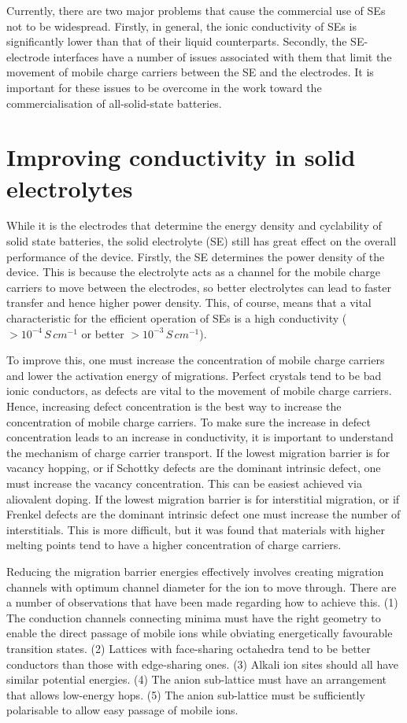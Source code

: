 \documentclass[10pt,a4paper, titlepage]{article}
\begin{document}
Currently, there are two major problems that cause the commercial use of SEs not to be widespread. Firstly, in general, the ionic conductivity of SEs is significantly lower than that of their liquid counterparts. Secondly, the SE-electrode interfaces have a number of issues associated with them that limit the movement of mobile charge carriers between the SE and the electrodes. It is important for these issues to be overcome in the work toward the commercialisation of all-solid-state batteries.

\section{Improving conductivity in solid electrolytes}

While it is the electrodes that determine the energy density and cyclability of solid state batteries, the solid electrolyte (SE) still has great effect on the overall performance of the device. 
Firstly, the SE determines the power density of the device. \cite{RN9}
This is because the electrolyte acts as a channel for the mobile charge carriers to move between the electrodes, so better electrolytes can lead to faster transfer and hence higher power density.
This, of course, means that a vital characteristic for the efficient operation of SEs is a high conductivity ($ > 10^{-4} \, S \, cm^{-1} $ or better $ > 10^{-3} \, S \, cm^{-1} $). \cite{RN3}

To improve this, one must increase the concentration of mobile charge carriers and lower the activation energy of migrations.
Perfect crystals tend to be bad ionic conductors, as defects are vital to the movement of mobile charge carriers.
Hence, increasing defect concentration is the best way to increase the concentration of mobile charge carriers.
To make sure the increase in defect concentration leads to an increase in conductivity, it is important to understand the mechanism of charge carrier transport.
If the lowest migration barrier is for vacancy hopping, or if Schottky defects are the dominant intrinsic defect, one must increase the vacancy concentration.
This can be easiest achieved via aliovalent doping.
If the lowest migration barrier is for interstitial migration, or if Frenkel defects are the dominant intrinsic defect one must increase the number of interstitials.
This is more difficult, but it was found that materials with higher melting points tend to have a higher concentration of charge carriers. \cite{RN8}

Reducing the migration barrier energies effectively involves creating migration channels with optimum channel diameter for the ion to move through. 
There are a number of observations that have been made regarding how to achieve this.
(1) The conduction channels connecting minima must have the right geometry to enable the direct passage of mobile ions while obviating energetically favourable transition states. 
(2) Lattices with face-sharing octahedra tend to be better conductors than those with edge-sharing ones.
(3) Alkali ion sites should all have similar potential energies. 
(4) The anion sub-lattice must have an arrangement that allows low-energy hops.
(5) The anion sub-lattice must be sufficiently polarisable to allow easy passage of mobile ions.
 
\end{document}
